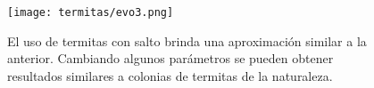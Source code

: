 \begin{figure}
  \centering
  \texttt{[image: termitas/evo3.png]}
  \caption{El uso de termitas con salto brinda una aproximación similar a la anterior. Cambiando algunos parámetros se pueden obtener resultados similares a colonias de termitas de la naturaleza.}
  \label{fig:evo3}
\end{figure}






